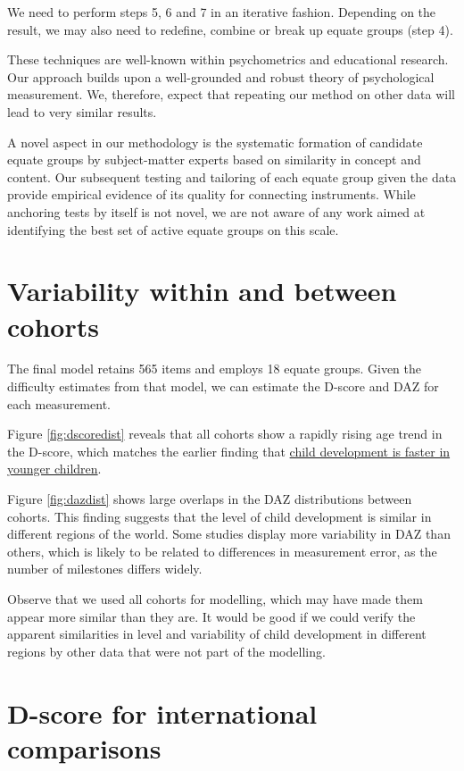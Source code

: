 \documentclass[
]{book}
\begin{document}
We need to perform steps 5, 6 and 7 in an iterative fashion. Depending on the result, we may also need to redefine, combine or break up equate groups (step 4).

These techniques are well-known within psychometrics and educational research. Our approach builds upon a well-grounded and robust theory of psychological measurement. We, therefore, expect that repeating our method on other data will lead to very similar results.

A novel aspect in our methodology is the systematic formation of candidate equate groups by subject-matter experts based on similarity in concept and content. Our subsequent testing and tailoring of each equate group given the data provide empirical evidence of its quality for connecting instruments. While anchoring tests by itself is not novel, we are not aware of any work aimed at identifying the best set of active equate groups on this scale.

\hypertarget{sec:variability}{%
\section{Variability within and between cohorts}\label{sec:variability}}

The final model retains 565 items and employs 18 equate groups. Given the difficulty estimates from that model, we can estimate the D-score and DAZ for each measurement.

Figure \ref{fig:dscoredist} reveals that all cohorts show a rapidly rising age trend in the D-score, which matches the earlier finding that \href{https://d-score.org/dbook1/sec-probage.html}{child development is faster in younger children}.

Figure \ref{fig:dazdist} shows large overlaps in the DAZ distributions between cohorts. This finding suggests that the level of child development is similar in different regions of the world. Some studies display more variability in DAZ than others, which is likely to be related to differences in measurement error, as the number of milestones differs widely.

Observe that we used all cohorts for modelling, which may have made them appear more similar than they are. It would be good if we could verify the apparent similarities in level and variability of child development in different regions by other data that were not part of the modelling.

\hypertarget{sec:internationalcomparisons}{%
\section{D-score for international comparisons}\label{sec:internationalcomparisons}}
\end{document}
